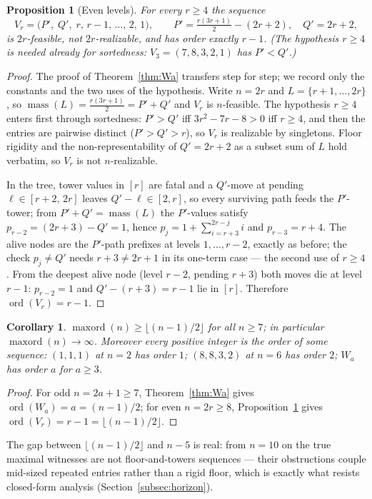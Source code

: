 \documentclass[11pt]{article}
\newtheorem{proposition}[theorem]{Proposition}
\newtheorem{corollary}[theorem]{Corollary}
\theoremstyle{definition}
\theoremstyle{remark}
\newcommand{\mass}{\operatorname{mass}}
\newcommand{\ord}{\operatorname{ord}}
\newcommand{\maxord}{\operatorname{maxord}}
\newcommand{\intv}[1]{[#1]}
\begin{document}
\begin{proposition}[Even levels]\label{prop:Vr}
For every $r\ge4$ the sequence
\[
V_r=\bigl(P',\;Q',\;r,\,r-1,\,\dots,\,2,\,1\bigr),\qquad
P'=\tfrac{r(3r+1)}{2}-(2r+2),\quad Q'=2r+2,
\]
is $2r$-feasible, not $2r$-realizable, and has order exactly $r-1$. (The hypothesis
$r\ge4$ is needed already for sortedness: $V_3=(7,8,3,2,1)$ has $P'<Q'$.)
\end{proposition}

\begin{proof}
The proof of Theorem~\ref{thm:Wa} transfers step for step; we record only the
constants and the two uses of the hypothesis. Write $n=2r$ and
$L=\{r+1,\dots,2r\}$, so $\mass(L)=\tfrac{r(3r+1)}{2}=P'+Q'$ and $V_r$ is
$n$-feasible. The hypothesis $r\ge4$ enters first through sortedness: $P'>Q'$
iff $3r^2-7r-8>0$ iff $r\ge4$, and then the entries are pairwise distinct
($P'>Q'>r$), so $V_r$ is realizable by singletons. Floor rigidity and the
non-representability of $Q'=2r+2$ as a subset sum of $L$ hold verbatim, so
$V_r$ is not $n$-realizable.

In the tree, tower values in $\intv r$ are fatal and a $Q'$-move at pending
$\ell\in[r+2,\,2r]$ leaves $Q'-\ell\in[2,r]$, so every surviving path feeds the
$P'$-tower; from $P'+Q'=\mass(L)$ the $P'$-values satisfy
$p_{r-2}=(2r+3)-Q'=1$, hence $p_j=1+\sum_{i=r+3}^{2r-j}i$ and $p_{r-3}=r+4$.
The alive nodes are the $P'$-path prefixes at levels $1,\dots,r-2$, exactly as
before; the check $p_j\neq Q'$ needs $r+3\neq2r+1$ in its one-term case --- the
second use of $r\ge4$. From the deepest alive node (level $r-2$, pending
$r+3$) both moves die at level $r-1$: $p_{r-2}=1$ and $Q'-(r+3)=r-1$ lie in
$\intv r$. Therefore $\ord(V_r)=r-1$.
\end{proof}

\begin{corollary}\label{cor:unbounded}
$\maxord(n)\ge\lfloor(n-1)/2\rfloor$ for all $n\ge7$; in particular
$\maxord(n)\to\infty$. Moreover every positive integer is the order of some
sequence: $(1,1,1)$ at $n=2$ has order $1$; $(8,8,3,2)$ at $n=6$ has order $2$;
$W_a$ has order $a$ for $a\ge3$.
\end{corollary}

\begin{proof}
For odd $n=2a+1\ge7$, Theorem~\ref{thm:Wa} gives $\ord(W_a)=a=(n-1)/2$; for even
$n=2r\ge8$, Proposition~\ref{prop:Vr} gives $\ord(V_r)=r-1=\lfloor(n-1)/2\rfloor$.
\end{proof}

The gap between $\lfloor(n-1)/2\rfloor$ and $n-5$ is real: from $n=10$ on the true
maximal witnesses are not floor-and-towers sequences --- their obstructions couple
mid-sized repeated entries rather than a rigid floor, which is exactly what resists
closed-form analysis (Section~\ref{subsec:horizon}).
\end{document}
